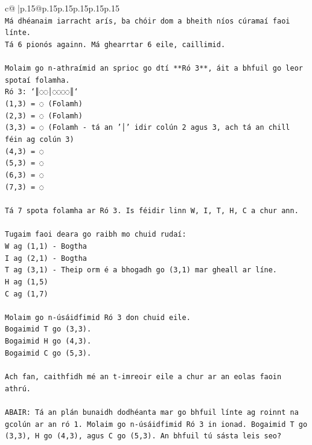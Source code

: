 \documentclass{article}
\begin{document}
{\begin{supertabular}{c@{$\;$}|p{.15\linewidth}@{}p{.15\linewidth}p{.15\linewidth}p{.15\linewidth}p{.15\linewidth}p{.15\linewidth}}
{{{\\ 
\texttt{Má dhéanaim iarracht arís, ba chóir dom a bheith níos cúramaí faoi línte.} \\
\texttt{Tá 6 pionós againn. Má ghearrtar 6 eile, caillimid.} \\
\\ 
\texttt{Molaim go n{-}athraímid an sprioc go dtí **Ró 3**, áit a bhfuil go leor spotaí folamha.} \\
\texttt{Ró 3: `║◌◌│◌◌◌◌║`} \\
\texttt{(1,3) = ◌ (Folamh)} \\
\texttt{(2,3) = ◌ (Folamh)} \\
\texttt{(3,3) = ◌ (Folamh {-} tá an '│' idir colún 2 agus 3, ach tá an chill féin ag colún 3)} \\
\texttt{(4,3) = ◌} \\
\texttt{(5,3) = ◌} \\
\texttt{(6,3) = ◌} \\
\texttt{(7,3) = ◌} \\
\\ 
\texttt{Tá 7 spota folamha ar Ró 3. Is féidir linn W, I, T, H, C a chur ann.} \\
\\ 
\texttt{Tugaim faoi deara go raibh mo chuid rudaí:} \\
\texttt{W ag (1,1) {-} Bogtha} \\
\texttt{I ag (2,1) {-} Bogtha} \\
\texttt{T ag (3,1) {-} Theip orm é a bhogadh go (3,1) mar gheall ar líne.} \\
\texttt{H ag (1,5)} \\
\texttt{C ag (1,7)} \\
\\ 
\texttt{Molaim go n{-}úsáidfimid Ró 3 don chuid eile.} \\
\texttt{Bogaimid T go (3,3).} \\
\texttt{Bogaimid H go (4,3).} \\
\texttt{Bogaimid C go (5,3).} \\
\\ 
\texttt{Ach fan, caithfidh mé an t{-}imreoir eile a chur ar an eolas faoin athrú.} \\
\\ 
\texttt{ABAIR: Tá an plán bunaidh dodhéanta mar go bhfuil línte ag roinnt na gcolún ar an ró 1. Molaim go n{-}úsáidfimid Ró 3 in ionad. Bogaimid T go (3,3), H go (4,3), agus C go (5,3). An bhfuil tú sásta leis seo?} \\
            }
        }
    }
     \\ \\


\end{supertabular}}
\end{document}
